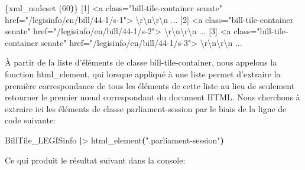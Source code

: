 \documentclass[
  letterpaper,
  DIV=11,
  numbers=noendperiod]{scrreprt}
\newenvironment{Shaded}{\begin{snugshade}}{\end{snugshade}}
\newcommand{\ErrorTok}[1]{\textcolor[rgb]{0.68,0.00,0.00}{#1}}
\newcommand{\ExtensionTok}[1]{\textcolor[rgb]{0.00,0.23,0.31}{#1}}
\newcommand{\KeywordTok}[1]{\textcolor[rgb]{0.00,0.23,0.31}{\textbf{#1}}}
\newcommand{\NormalTok}[1]{\textcolor[rgb]{0.00,0.23,0.31}{#1}}
\newcommand{\OperatorTok}[1]{\textcolor[rgb]{0.37,0.37,0.37}{#1}}
\newcommand{\StringTok}[1]{\textcolor[rgb]{0.13,0.47,0.30}{#1}}
\begin{document}
\begin{Shaded}
\begin{Highlighting}[]
\ExtensionTok{\{xml\_nodeset} \ErrorTok{(}\ExtensionTok{60}\KeywordTok{)}\ErrorTok{\}}
 \ExtensionTok{[1]} \OperatorTok{\textless{}}\NormalTok{a class=}\StringTok{"bill{-}tile{-}container senate"}\NormalTok{ href=}\StringTok{"/legisinfo/en/bill/44{-}1/s{-}1"}\OperatorTok{\textgreater{}}
 \ExtensionTok{\textbackslash{}r\textbackslash{}n\textbackslash{}r\textbackslash{}n}\NormalTok{     ...}
 \ExtensionTok{[2]} \OperatorTok{\textless{}}\NormalTok{a class=}\StringTok{"bill{-}tile{-}container senate"}\NormalTok{ href=}\StringTok{"/legisinfo/en/bill/44{-}1/s{-}2"}\OperatorTok{\textgreater{}}
 \ExtensionTok{\textbackslash{}r\textbackslash{}n\textbackslash{}r\textbackslash{}n}\NormalTok{     ...}
 \ExtensionTok{[3]} \OperatorTok{\textless{}}\NormalTok{a class=}\StringTok{"bill{-}tile{-}container senate"}\NormalTok{ href=}\StringTok{"/legisinfo/en/bill/44{-}1/s{-}3"}\OperatorTok{\textgreater{}}
 \ExtensionTok{\textbackslash{}r\textbackslash{}n\textbackslash{}r\textbackslash{}n}\NormalTok{     ...}
\end{Highlighting}
\end{Shaded}

À partir de la liste d'éléments de classe bill-tile-container, nous
appelons la fonction html\_element, qui lorsque appliqué à une liste
permet d'extraire la première correspondance de tous les éléments de
cette liste au lieu de seulement retourner le premier nœud correspondant
du document HTML. Nous cherchons à extraire ici les éléments de classe
parliament-session par le biais de la ligne de code suivante:

\begin{Shaded}
\begin{Highlighting}[]
\ExtensionTok{BillTile\_LEGISinfo} \KeywordTok{|}\OperatorTok{\textgreater{}}\NormalTok{ html\_element}\KeywordTok{(}\StringTok{".parliament{-}session"}\KeywordTok{)} 
\end{Highlighting}
\end{Shaded}

Ce qui produit le résultat suivant dans la console:
\end{document}
